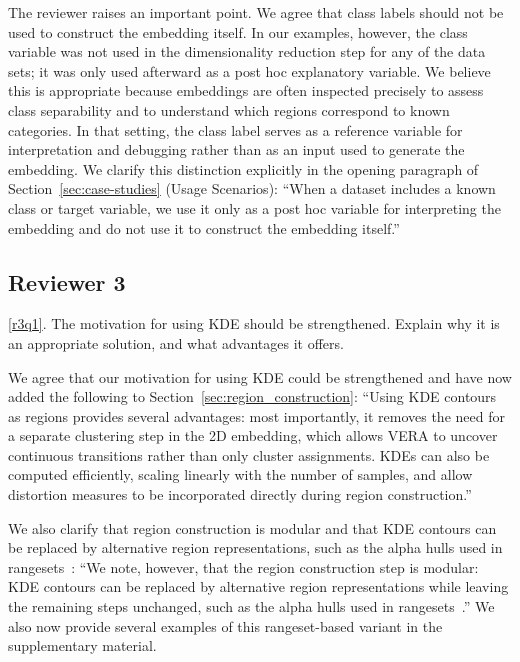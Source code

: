 \documentclass[11pt]{article}
\newcounter{rtaskno}
\newcommand{\rtask}[1]{\refstepcounter{rtaskno}\label{#1}}
\newcommand{\reviewc}[2]{\begin{leftbar}\noindent\rtask{#1}\ref{#1}. #2\end{leftbar}\vspace*{-4mm}}
\newcommand{\answer}[1]{\noindent #1\par\vspace{2mm}}
\newlength{\leftbarwidth}
\newlength{\leftbarsep}
\renewenvironment{leftbar}{%
    \def\FrameCommand{{\color{black}{\vrule width \leftbarwidth\relax\hspace {\leftbarsep}}}}%
    \MakeFramed {\advance \hsize -\width \FrameRestore }%
}{\endMakeFramed}
\begin{document}
\answer{%
The reviewer raises an important point. We agree that class labels should not be used to construct the embedding itself. In our examples, however, the class variable was not used in the dimensionality reduction step for any of the data sets; it was only used afterward as a post hoc explanatory variable. We believe this is appropriate because embeddings are often inspected precisely to assess class separability and to understand which regions correspond to known categories. In that setting, the class label serves as a reference variable for interpretation and debugging rather than as an input used to generate the embedding. We clarify this distinction explicitly in the opening paragraph of Section~\ref{sec:case-studies} (Usage Scenarios): ``When a dataset includes a known class or target variable, we use it only as a post hoc variable for interpreting the embedding and do not use it to construct the embedding itself.''
}



\subsection*{Reviewer 3}

\reviewc{r3q1}{The motivation for using KDE should be strengthened. Explain why it is an appropriate solution, and what advantages it offers.}

\answer{%
We agree that our motivation for using KDE could be strengthened and have now added the following to Section~\ref{sec:region_construction}: ``Using KDE contours as regions provides several advantages: most importantly, it removes the need for a separate clustering step in the 2D embedding, which allows VERA to uncover continuous transitions rather than only cluster assignments. KDEs can also be computed efficiently, scaling linearly with the number of samples, and allow distortion measures to be incorporated directly during region construction.''

We also clarify that region construction is modular and that KDE contours can be replaced by alternative region representations, such as the alpha hulls used in rangesets~\citep{Sohns2022}: ``We note, however, that the region construction step is modular: KDE contours can be replaced by alternative region representations while leaving the remaining steps unchanged, such as the alpha hulls used in rangesets~\cite{Sohns2022}.'' We also now provide several examples of this rangeset-based variant in the supplementary material.
}
\end{document}
